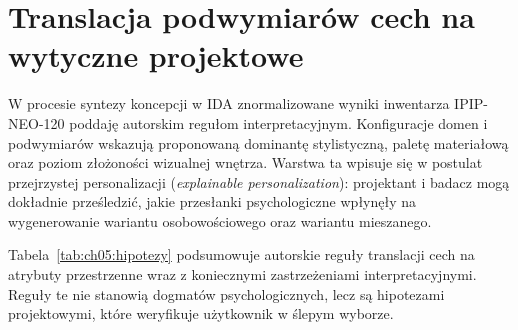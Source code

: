 \section{Translacja podwymiarów cech na wytyczne projektowe}
\label{ch05:sec:mapowanie}

W procesie syntezy koncepcji w IDA znormalizowane wyniki inwentarza IPIP-NEO-120 poddaję autorskim regułom interpretacyjnym.
Konfiguracje domen i podwymiarów wskazują proponowaną dominantę stylistyczną, paletę materiałową oraz poziom złożoności wizualnej wnętrza.
Warstwa ta wpisuje się w postulat przejrzystej personalizacji (\emph{explainable personalization}): projektant i badacz mogą dokładnie prześledzić, jakie przesłanki psychologiczne wpłynęły na wygenerowanie wariantu osobowościowego oraz wariantu mieszanego.

Tabela~\ref{tab:ch05:hipotezy} podsumowuje autorskie reguły translacji cech na atrybuty przestrzenne wraz z koniecznymi zastrzeżeniami interpretacyjnymi. Reguły te nie stanowią dogmatów psychologicznych, lecz są hipotezami projektowymi, które weryfikuje użytkownik w ślepym wyborze.

